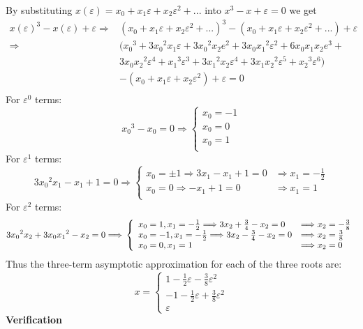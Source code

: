 \documentclass[12pt]{article}
\newcommand{\e}{\varepsilon}
\newcommand{\lra}{\Longrightarrow}
\newenvironment{solution}[1][Solution]{\begin{trivlist}
  \item[\hskip \labelsep {\bfseries #1} \hskip \labelsep]}{\end{trivlist}}
\theoremstyle{remark}
\begin{document}
\begin{solution}
  By substituting \(x(\e) = x_0+x_1\e+x_2\e^2 + ... \) into \(x^3 - x + \e = 0\) we get
  \begin{align*}
    x(\e)^3 - x(\e) + \e \lra& (x_0+x_1\e+x_2\e^2 + ...)^3 - (x_0+x_1\e+x_2\e^2 + ...) + \e \\
                         \lra& ({x_0}^3+3{x_0}^2{x_1}\e+3{x_0}^2x_2e^2+3x_0{x_1}^2\e^2+ 6x_0x_1x_2e^3+\\
                             &3x_0{x_2}^2\e^4+{x_1}^3\e^3+3{x_1}^2{x_2}\e^4+3x_1{x_2}^2\e^5+{x_2}^3\e^6) \\
                             &- (x_0+x_1\e+x_2\e^2) +\e  = 0\\
  \end{align*}
  For \(\e^0\) terms:
  \[
    {x_0}^3-x_0 = 0 \lra
    \left\{
      \begin{array}{ll}
        x_0 = -1\\
        x_0 = 0\\
        x_0 = 1\\
      \end{array}
    \right.
  \]
  For \(\e^1\) terms:
  \[
    3{x_0}^2x_1 - x_1 + 1 = 0 \lra
        \left\{
      \begin{array}{ll}
        x_0 = \pm1 \lra 3x_1 - x_1 + 1 = 0 &\lra x_1 = -\frac{1}{2}\\
        x_0 = 0 \lra - x_1 + 1 = 0 &\lra x_1 = 1\\
      \end{array}
    \right.
  \]
  For \(\e^2\) terms:
  \[
    3{x_0}^2x_2+3x_0{x_1}^2-x_2 = 0\lra \\
    \left\{
      \begin{array}{ll}
        x_0 = 1, x_1 = -\tfrac{1}{2} \lra 3x_2 + \tfrac{3}{4} - x_2 = 0 &\lra x_2 = -\tfrac{3}{8} \\
        x_0 = -1, x_1 = -\tfrac{1}{2} \lra 3x_2 - \tfrac{3}{4} - x_2 = 0 &\lra x_2 = \tfrac{3}{8} \\
        x_0 = 0, x_1 = 1 &\lra x_2 = 0
      \end{array}
    \right.
  \]
  Thus the three-term asymptotic approximation for each of the three roots are:
  \[
    x = 
    \left\{
      \begin{array}{ll}
        1-\tfrac{1}{2}\e-\tfrac{3}{8}\e^2 \\
        -1-\tfrac{1}{2}\e+\tfrac{3}{8}\e^2 \\
        \e
      \end{array}
    \right.
  \]
  \textbf{Verification}

\end{solution}
\end{document}
